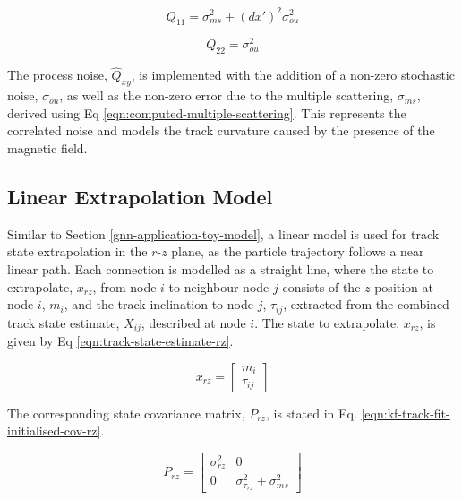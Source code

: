 \begin{equation}
Q_{11} = \sigma_{ms}^2 + (dx')^{2} \sigma_{ou}^{2}
\label{eqn:q22}
\end{equation}

\begin{equation}
Q_{22} = \sigma_{ou}^2
\label{eqn:q22}
\end{equation}

The process noise, $\hat{Q}_{xy}$, is implemented with the addition of a non-zero stochastic noise, $\sigma_{ou}$, as well as the non-zero error due to the multiple scattering, $\sigma_{ms}$, derived using Eq \eqref{eqn:computed-multiple-scattering}. This represents the correlated noise and models the track curvature caused by the presence of the magnetic field.














\clearpage
\subsection{Linear Extrapolation Model}
\label{chapter-6-r-z-plane-impl}


Similar to Section \ref{gnn-application-toy-model}, a linear model is used for track state extrapolation in the $r$-$z$ plane, as the particle trajectory follows a near linear path. Each connection is modelled as a straight line, where the state to extrapolate, $x_{rz}$, from node $i$ to neighbour node $j$ consists of the $z$-position at node $i$, $m_i$, and the track inclination to node $j$, $\tau_{ij}$, extracted from the combined track state estimate, $X_{ij}$, described at node $i$. The state to extrapolate, $x_{rz}$, is given by Eq \eqref{eqn:track-state-estimate-rz}.

\begin{equation}
x_{rz} = \begin{bmatrix} m_i \\ \tau_{ij} \end{bmatrix}
\label{eqn:track-state-estimate-rz}
\end{equation}


The corresponding state covariance matrix, $P_{rz}$, is stated in Eq. \eqref{eqn:kf-track-fit-initialised-cov-rz}.  

\begin{equation}
P_{rz} = \begin{bmatrix} \sigma_{rz}^2 & 0 \\ 0 & \sigma_{\tau_{rz}}^2 + \sigma_{ms}^2 \end{bmatrix} 
\label{eqn:kf-track-fit-initialised-cov-rz}
\end{equation}


